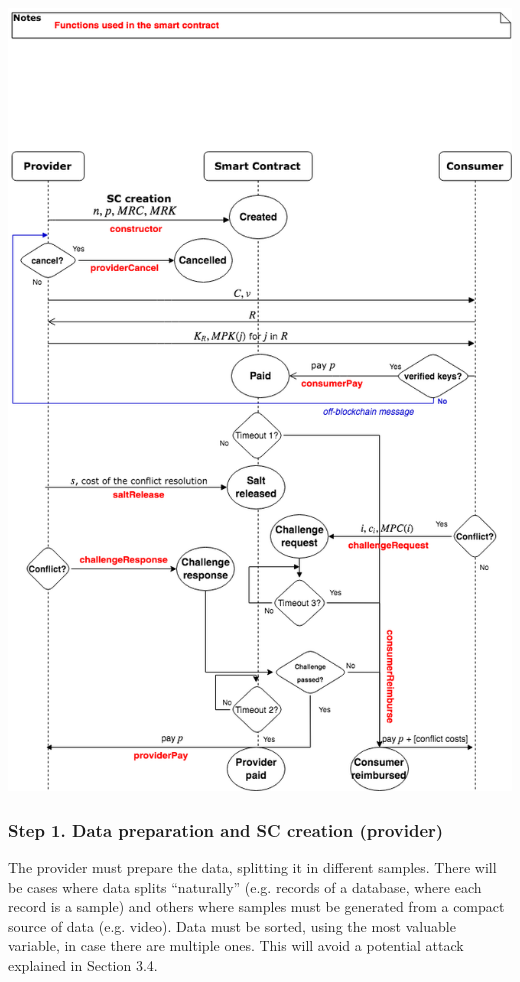 \documentclass[]{article}
\begin{document}
	\includegraphics[width=\textwidth,height=\textheight,keepaspectratio]{../figures/Diagram_InteractionSC}

	
	\subsubsection{Step 1. Data preparation and SC creation (provider)}
	The provider must prepare the data, splitting it in different samples. There will be cases where data splits “naturally” (e.g. records of a database, where each record is a sample) and others where samples must be generated from a compact source of data (e.g. video). Data must be sorted, using the most valuable variable, in case there are multiple ones. This will avoid a potential attack explained in Section 3.4.
\end{document}
